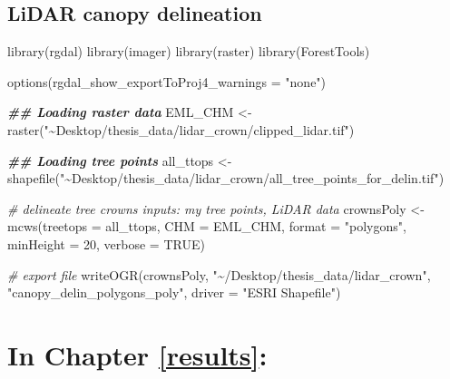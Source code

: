 \documentclass[12pt,twoside]{reedthesis}
\newenvironment{Shaded}{\begin{snugshade}}{\end{snugshade}}
\newcommand{\AttributeTok}[1]{\textcolor[rgb]{0.77,0.63,0.00}{#1}}
\newcommand{\CommentTok}[1]{\textcolor[rgb]{0.56,0.35,0.01}{\textit{#1}}}
\newcommand{\ConstantTok}[1]{\textcolor[rgb]{0.00,0.00,0.00}{#1}}
\newcommand{\DecValTok}[1]{\textcolor[rgb]{0.00,0.00,0.81}{#1}}
\newcommand{\DocumentationTok}[1]{\textcolor[rgb]{0.56,0.35,0.01}{\textbf{\textit{#1}}}}
\newcommand{\FunctionTok}[1]{\textcolor[rgb]{0.00,0.00,0.00}{#1}}
\newcommand{\NormalTok}[1]{#1}
\newcommand{\OtherTok}[1]{\textcolor[rgb]{0.56,0.35,0.01}{#1}}
\newcommand{\StringTok}[1]{\textcolor[rgb]{0.31,0.60,0.02}{#1}}
\begin{document}
\hypertarget{lidar-canopy-delineation}{%
\subsection*{LiDAR canopy delineation}\label{lidar-canopy-delineation}}

\footnotesize
\begin{Shaded}
\begin{Highlighting}[]
\FunctionTok{library}\NormalTok{(rgdal)}
\FunctionTok{library}\NormalTok{(imager)}
\FunctionTok{library}\NormalTok{(raster)}
\FunctionTok{library}\NormalTok{(ForestTools)}

\FunctionTok{options}\NormalTok{(}\AttributeTok{rgdal\_show\_exportToProj4\_warnings =} \StringTok{"none"}\NormalTok{)}

\DocumentationTok{\#\# Loading raster data}
\NormalTok{EML\_CHM }\OtherTok{\textless{}{-}} \FunctionTok{raster}\NormalTok{(}\StringTok{"\textasciitilde{}Desktop/thesis\_data/lidar\_crown/clipped\_lidar.tif"}\NormalTok{)}

\DocumentationTok{\#\# Loading tree points}
\NormalTok{all\_ttops }\OtherTok{\textless{}{-}} \FunctionTok{shapefile}\NormalTok{(}\StringTok{"\textasciitilde{}Desktop/thesis\_data/lidar\_crown/all\_tree\_points\_for\_delin.tif"}\NormalTok{)}

\CommentTok{\# delineate tree crowns inputs: my tree points, LiDAR data}
\NormalTok{crownsPoly }\OtherTok{\textless{}{-}} \FunctionTok{mcws}\NormalTok{(}\AttributeTok{treetops =}\NormalTok{ all\_ttops, }\AttributeTok{CHM =}\NormalTok{ EML\_CHM, }\AttributeTok{format =} \StringTok{"polygons"}\NormalTok{,}
    \AttributeTok{minHeight =} \DecValTok{20}\NormalTok{, }\AttributeTok{verbose =} \ConstantTok{TRUE}\NormalTok{)}

\CommentTok{\# export file}
\FunctionTok{writeOGR}\NormalTok{(crownsPoly, }\StringTok{"\textasciitilde{}/Desktop/thesis\_data/lidar\_crown"}\NormalTok{, }\StringTok{"canopy\_delin\_polygons\_poly"}\NormalTok{,}
    \AttributeTok{driver =} \StringTok{"ESRI Shapefile"}\NormalTok{)}
\end{Highlighting}
\end{Shaded}
\hypertarget{in-chapter-refresults}{%
\section*{\texorpdfstring{\textbf{In Chapter} \ref{results}\textbf{:}}{In Chapter \ref{results}:}}\label{in-chapter-refresults}}
\end{document}
